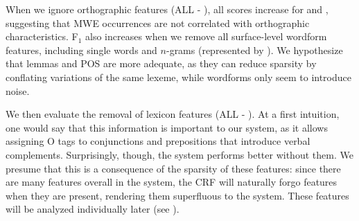 \documentclass[output=paper,
modfonts
]{langscibook}
\begin{document}


When we ignore orthographic features ({\textsc ALL} - ), all scores increase for \devAQ{} and \devDD{}, suggesting that  MWE occurrences are not correlated with orthographic characteristics. F$_1$ also increases when we remove all surface-level wordform features, including single words and $n$-grams (represented by ). We hypothesize that  lemmas and POS are more adequate, as they can reduce sparsity by conflating variations of the same lexeme, while wordforms only seem to introduce noise.

We then evaluate the removal of lexicon features ({\textsc ALL} - ).
At a first intuition, one would say that this information is important to our system, as it allows assigning O tags to conjunctions and prepositions that introduce verbal complements. Surprisingly, though, the system performs better without them. 
We presume that this is a consequence of the sparsity of these features: since there are many features overall in the system, the CRF will naturally forgo  features when they are present, rendering them superfluous to the system. These features will be analyzed individually later (see ).
\end{document}
